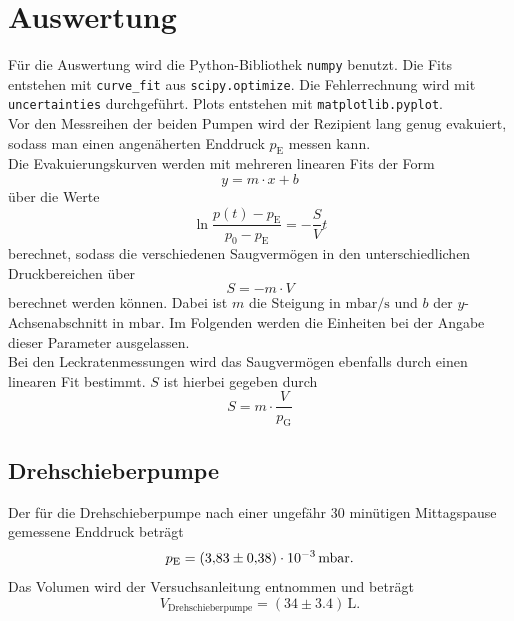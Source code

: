 \section{Auswertung}
\label{sec:Auswertung}

Für die Auswertung wird die Python-Bibliothek \texttt{numpy} benutzt. Die Fits entstehen mit \texttt{curve\_fit} aus \texttt{scipy.optimize}.
Die Fehlerrechnung wird mit \texttt{uncertainties} durchgeführt. Plots entstehen mit \texttt{matplotlib.pyplot}. \\
Vor den Messreihen der beiden Pumpen wird der Rezipient lang genug evakuiert, sodass man einen angenäherten Enddruck $p_\text{E}$ messen kann. \\
Die Evakuierungskurven werden mit mehreren linearen Fits der Form
\begin{equation}
    y = m \cdot x + b
\end{equation}
über die Werte
\begin{equation}
    \ln{\frac{p(t) - p_\text{E}}{p_0 - p_\text{E}}} = -\frac{S}{V}t
    \label{eq:linfit}
\end{equation}
berechnet, sodass die verschiedenen Saugvermögen in den unterschiedlichen Druckbereichen über
\begin{equation}
    S = -m \cdot V
    \label{eq:S_evak}
\end{equation}
berechnet werden können. Dabei ist $m$ die Steigung in $\si{\milli\bar\per\second}$ und $b$ der $y$-Achsenabschnitt in $\si{\milli\bar}$. Im Folgenden werden die Einheiten bei der Angabe dieser Parameter ausgelassen.\\
Bei den Leckratenmessungen wird das Saugvermögen ebenfalls durch einen linearen Fit bestimmt.
$S$ ist hierbei gegeben durch
\begin{equation}
    S = m \cdot \frac{V}{p_\text{G}}
    \label{eq:S_leck}
\end{equation}

\subsection{Drehschieberpumpe}

Der für die Drehschieberpumpe nach einer ungefähr 30 minütigen Mittagspause gemessene Enddruck beträgt
\begin{equation}
    p_\text{E} = (\num{3.83} \pm \num{0.38}) \cdot 10^{-3} \, \si{\milli\bar}.\\
\end{equation}
Das Volumen wird der Versuchsanleitung entnommen und beträgt
\begin{equation}
    V_\text{Drehschieberpumpe} = (\num{34} \pm \num{3.4}) \, \si{\liter}.
\end{equation}


